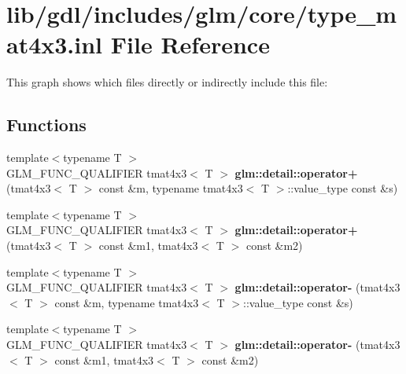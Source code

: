 \hypertarget{type__mat4x3_8inl}{}\section{lib/gdl/includes/glm/core/type\+\_\+mat4x3.inl File Reference}
\label{type__mat4x3_8inl}
This graph shows which files directly or indirectly include this file\+:
\subsection*{Functions}
\begin{DoxyCompactItemize}
\item 
\hypertarget{namespaceglm_1_1detail_a7254d84728b7156831f048a23e82ba5f}{}{\footnotesize template$<$typename T $>$ }\\G\+L\+M\+\_\+\+F\+U\+N\+C\+\_\+\+Q\+U\+A\+L\+I\+F\+I\+E\+R tmat4x3$<$ T $>$ {\bfseries glm\+::detail\+::operator+} (tmat4x3$<$ T $>$ const \&m, typename tmat4x3$<$ T $>$\+::value\+\_\+type const \&s)\label{namespaceglm_1_1detail_a7254d84728b7156831f048a23e82ba5f}

\item 
\hypertarget{namespaceglm_1_1detail_a7fc7624088b1bb5bf684a4dbc9ff79cf}{}{\footnotesize template$<$typename T $>$ }\\G\+L\+M\+\_\+\+F\+U\+N\+C\+\_\+\+Q\+U\+A\+L\+I\+F\+I\+E\+R tmat4x3$<$ T $>$ {\bfseries glm\+::detail\+::operator+} (tmat4x3$<$ T $>$ const \&m1, tmat4x3$<$ T $>$ const \&m2)\label{namespaceglm_1_1detail_a7fc7624088b1bb5bf684a4dbc9ff79cf}

\item 
\hypertarget{namespaceglm_1_1detail_a185d2953b132fd46f6c99f89a5d90ca5}{}{\footnotesize template$<$typename T $>$ }\\G\+L\+M\+\_\+\+F\+U\+N\+C\+\_\+\+Q\+U\+A\+L\+I\+F\+I\+E\+R tmat4x3$<$ T $>$ {\bfseries glm\+::detail\+::operator-\/} (tmat4x3$<$ T $>$ const \&m, typename tmat4x3$<$ T $>$\+::value\+\_\+type const \&s)\label{namespaceglm_1_1detail_a185d2953b132fd46f6c99f89a5d90ca5}

\item 
\hypertarget{namespaceglm_1_1detail_ab7c000595e2d011c003fa5419cc21a5d}{}{\footnotesize template$<$typename T $>$ }\\G\+L\+M\+\_\+\+F\+U\+N\+C\+\_\+\+Q\+U\+A\+L\+I\+F\+I\+E\+R tmat4x3$<$ T $>$ {\bfseries glm\+::detail\+::operator-\/} (tmat4x3$<$ T $>$ const \&m1, tmat4x3$<$ T $>$ const \&m2)\label{namespaceglm_1_1detail_ab7c000595e2d011c003fa5419cc21a5d}


\end{DoxyCompactItemize}
